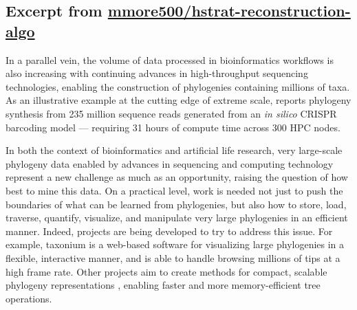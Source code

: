 \subsection{Excerpt from \href{https://github.com/mmore500/hstrat-reconstruction-algo/}{mmore500/hstrat-reconstruction-algo}}
\label{sec:big-phylogeny}

In a parallel vein, the volume of data processed in bioinformatics workflows is also increasing with continuing advances in high-throughput sequencing technologies, enabling the construction of phylogenies containing millions of taxa.
As an illustrative example at the cutting edge of extreme scale, \citet{konno2022deep} reports phylogeny synthesis from 235 million sequence reads generated from an \textit{in silico} CRISPR barcoding model --- requiring 31 hours of compute time across 300 HPC nodes.

In both the context of bioinformatics and artificial life research, very large-scale phylogeny data enabled by advances in sequencing and computing technology represent a new challenge as much as an opportunity, raising the question of how best to mine this data.
On a practical level, work is needed not just to push the boundaries of what can be learned from phylogenies, but also how to store, load, traverse, quantify, visualize, and manipulate very large phylogenies in an efficient manner.
Indeed, projects are being developed to try to address this issue.
For example, taxonium \citep{sanderson2022taxonium} is a web-based software for visualizing large phylogenies in a flexible, interactive manner, and is able to handle browsing millions of tips at a high frame rate.
Other projects aim to create methods for compact, scalable phylogeny representations \citep{moshiri2025compacttree, moshiri2020treeswift}, enabling faster and more memory-efficient tree operations.

